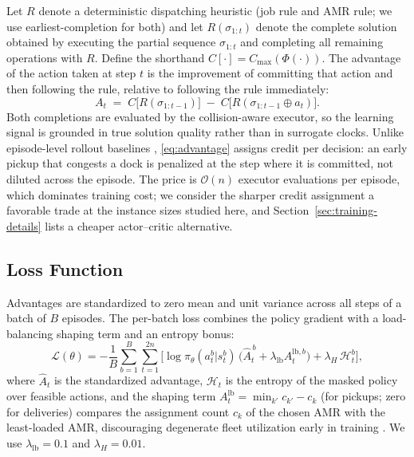 Let $R$ denote a deterministic dispatching heuristic (job rule and AMR
rule; we use earliest-completion for both) and let
$R(\sigma_{1:t})$ denote the complete solution obtained by executing
the partial sequence $\sigma_{1:t}$ and completing all remaining
operations with $R$. Define the shorthand
$C[\cdot]=C_{\max}(\Phi(\cdot))$. The advantage of the action taken at
step $t$ is the improvement of committing that action and then
following the rule, relative to following the rule immediately:
\begin{equation}
A_t \;=\; C\big[R(\sigma_{1:t-1})\big]\;-\;
C\big[R(\sigma_{1:t-1}\oplus a_t)\big].
\label{eq:advantage}
\end{equation}
Both completions are evaluated by the collision-aware executor, so the
learning signal is grounded in true solution quality rather than in
surrogate clocks. Unlike episode-level rollout baselines
\cite{rennie2017self,kool2019attention}, \eqref{eq:advantage} assigns
credit per decision: an early pickup that congests a dock is penalized
at the step where it is committed, not diluted across the episode.
The price is $\mathcal{O}(n)$ executor evaluations per episode, which
dominates training cost; we consider the sharper credit assignment a
favorable trade at the instance sizes studied here, and
Section~\ref{sec:training-details} lists a cheaper actor--critic
alternative.

\subsection{Loss Function}

Advantages are standardized to zero mean and unit variance across all
steps of a batch of $B$ episodes. The per-batch loss combines the
policy gradient with a load-balancing shaping term and an entropy
bonus:
\begin{equation}
\mathcal{L}(\theta)=
-\frac{1}{B}\sum_{b=1}^{B}\sum_{t=1}^{2n}
\Big[\log\pi_\theta(a_t^b|s_t^b)\,
\big(\hat{A}_t^{\,b}+\lambda_{\mathrm{lb}}A_t^{\mathrm{lb},b}\big)
+\lambda_{H}\,\mathcal{H}_t^{b}\Big],
\label{eq:loss}
\end{equation}
where $\hat{A}_t$ is the standardized advantage,
$\mathcal{H}_t$ is the entropy of the masked policy over feasible
actions, and the shaping term
$A^{\mathrm{lb}}_t=\min_{k'}c_{k'}-c_{k}$ (for pickups; zero for
deliveries) compares the assignment count $c_k$ of the chosen AMR with
the least-loaded AMR, discouraging degenerate fleet utilization early
in training \cite{ng1999shaping}. We use
$\lambda_{\mathrm{lb}}=0.1$ and $\lambda_{H}=0.01$.

